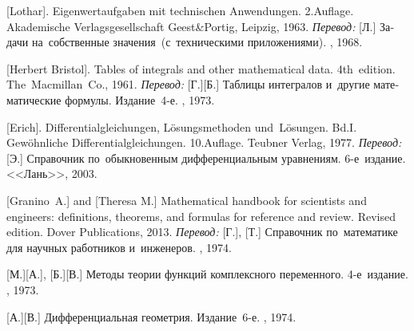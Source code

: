 \begin{thebibliography}{123}
\begin{otherlanguage}{russian}
[Lothar]. Eigenwertaufgaben mit technischen Anwendungen. 2.\:Auflage. Akademische Verlagsgesellschaft Geest\;\&\;Portig, Leipzig, 1963. 
\emph{Перевод:} [Л.] Задачи на~собственные значения~(с~техническими приложениями). \naukapublisher, 1968. 

[Herbert Bristol]. Tables of integrals and other mathematical data. 4th~edition. The~Macmillan~Co., 1961. 
\emph{Перевод:} [Г.][Б.] Таблицы интегралов и~другие математические формулы. Издание~4\hbox{-}е. \naukapublisher, 1973. 

[Erich]. Differentialgleichungen, Lösungsmethoden und~Lö\-sun\-gen. Bd.\:I. Gewöhnliche Differentialgleichungen. 10.\:Auflage. Teubner Verlag, 1977. 
\emph{Перевод:} [Э.] Справочник по~обыкновенным дифференциальным уравнениям. 6\hbox{-}е~издание. <<Лань>>, 2003. 

[Granino~A.] and [Theresa M.]
Mathematical handbook for scientists and engineers: definitions, theorems, and formulas for reference and review.
Revised edition. Dover Publications, 2013. 
\emph{Перевод:}
[Г.],
[Т.]
Справочник по~математике для научных работников и~инженеров.
\naukapublisher,
1974.

[М.][А.],
[Б.][В.]
Методы теории функций комплексного переменного.
4\hbox{-}е~издание.
\naukapublisher,
1973.

[А.][В.]
Дифференциальная геометрия.
Издание~6\hbox{-}е.
\naukapublisher,
1974.

\end{otherlanguage}

\normalsize
\end{thebibliography}
